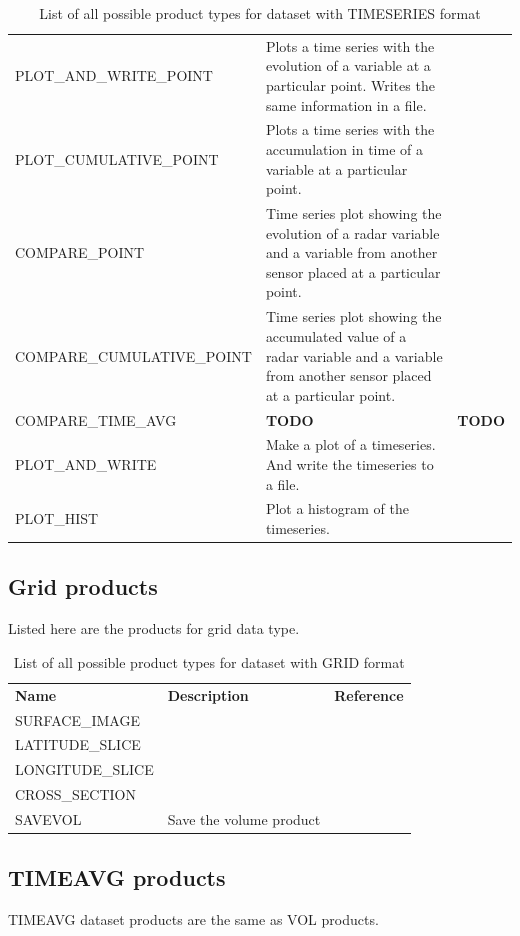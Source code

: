\documentclass[a4paper,11pt,pdftex,twoside]{scrartcl}
\renewcommand{\bf}{\normalfont \bfseries}
\begin{document}
{{{\begin{table}[H]
\begin{tabularx}{\textwidth}{lXl}
PLOT\_AND\_WRITE\_POINT    & Plots a time series with the evolution of a variable at a particular point. Writes the same information in a file. & \\
PLOT\_CUMULATIVE\_POINT    & Plots a time series with the accumulation in time of a variable at a particular point.  & \\
COMPARE\_POINT             & Time series plot showing the evolution of a radar variable and a variable from another sensor placed at a particular point. & \\
COMPARE\_CUMULATIVE\_POINT & Time series plot showing the accumulated value of a radar variable and a variable from another sensor placed at a particular point. & \\
COMPARE\_TIME\_AVG & {\bf TODO} & {\bf TODO} \\
PLOT\_AND\_WRITE           & Make a plot of a timeseries. And write
                             the timeseries to a file.              & \\
PLOT\_HIST           & Plot a histogram of the timeseries.  & \\
\end{tabularx}
\caption{List of all possible product types for dataset with TIMESERIES format}
\label{tab_products_TIMESERIES}
\end{table}

\subsection{Grid products}
Listed here are the products for grid data type.

\begin{table}[H]
\begin{tabularx}{\textwidth}{lXl}
{\bf Name} & {\bf Description} & {\bf Reference}\\

SURFACE\_IMAGE    &  &  \\
LATITUDE\_SLICE &  & \\
LONGITUDE\_SLICE &  & \\
CROSS\_SECTION &  & \\
SAVEVOL & Save the volume product & \\


\end{tabularx}
\caption{List of all possible product types for dataset with GRID format}
\label{tab_products_GRID}
\end{table}

\subsection{TIMEAVG products}
TIMEAVG dataset products are the same as VOL products.

}}}
\end{document}
